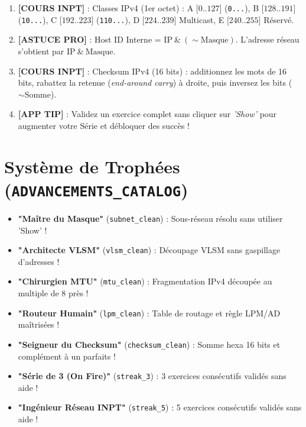 \documentclass[11pt,a4paper]{report}
\begin{document}
\begin{enumerate}
    \item \textbf{[COURS INPT]} : Classes IPv4 (1er octet) : A [$0..127$] (\texttt{0...}), B [$128..191$] (\texttt{10...}), C [$192..223$] (\texttt{110...}), D [$224..239$] Multicast, E [$240..255$] R\'eserv\'e.
    \item \textbf{[ASTUCE PRO]} : Host ID Interne = $\text{IP} \ \& \ (\sim\text{Masque})$. L'adresse r\'eseau s'obtient par $\text{IP} \ \& \ \text{Masque}$.
    \item \textbf{[COURS INPT]} : Checksum IPv4 (16 bits) : additionnez les mots de 16 bits, rabattez la retenue (\textit{end-around carry}) \`a droite, puis inversez les bits ($\sim\text{Somme}$).
    \item \textbf{[APP TIP]} : Validez un exercice complet sans cliquer sur \textit{'Show'} pour augmenter votre S\'erie et d\'ebloquer des succ\`es !
\end{enumerate}

\section{Syst\`eme de Troph\'ees (\texttt{ADVANCEMENTS\_CATALOG})}
\begin{itemize}
    \item \textbf{"Ma\^itre du Masque"} (\texttt{subnet\_clean}) : Sous-r\'eseau r\'esolu sans utiliser 'Show' !
    \item \textbf{"Architecte VLSM"} (\texttt{vlsm\_clean}) : D\'ecoupage VLSM sans gaspillage d'adresses !
    \item \textbf{"Chirurgien MTU"} (\texttt{mtu\_clean}) : Fragmentation IPv4 d\'ecoup\'ee au multiple de 8 pr\`es !
    \item \textbf{"Routeur Humain"} (\texttt{lpm\_clean}) : Table de routage et r\`egle LPM/AD ma\^itris\'ees !
    \item \textbf{"Seigneur du Checksum"} (\texttt{checksum\_clean}) : Somme hexa 16 bits et compl\'ement \`a un parfaits !
    \item \textbf{"S\'erie de 3 (On Fire)"} (\texttt{streak\_3}) : 3 exercices cons\'ecutifs valid\'es sans aide !
    \item \textbf{"Ing\'enieur R\'eseau INPT"} (\texttt{streak\_5}) : 5 exercices cons\'ecutifs valid\'es sans aide !
\end{itemize}

\end{document}
